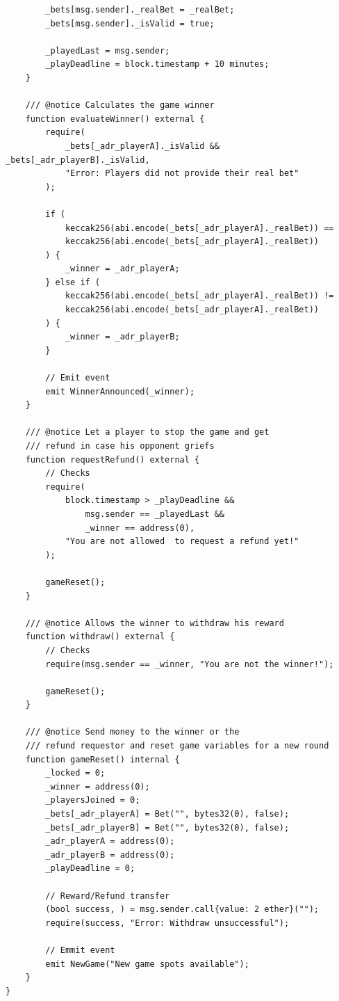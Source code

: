\documentclass[12pt,a4paper]{article}
\begin{document}
\begin{lstlisting}
        _bets[msg.sender]._realBet = _realBet;
        _bets[msg.sender]._isValid = true;

        _playedLast = msg.sender;
        _playDeadline = block.timestamp + 10 minutes;
    }

    /// @notice Calculates the game winner
    function evaluateWinner() external {
        require(
            _bets[_adr_playerA]._isValid && _bets[_adr_playerB]._isValid,
            "Error: Players did not provide their real bet"
        );

        if (
            keccak256(abi.encode(_bets[_adr_playerA]._realBet)) ==
            keccak256(abi.encode(_bets[_adr_playerA]._realBet))
        ) {
            _winner = _adr_playerA;
        } else if (
            keccak256(abi.encode(_bets[_adr_playerA]._realBet)) !=
            keccak256(abi.encode(_bets[_adr_playerA]._realBet))
        ) {
            _winner = _adr_playerB;
        }

        // Emit event
        emit WinnerAnnounced(_winner);
    }

    /// @notice Let a player to stop the game and get 
    /// refund in case his opponent griefs
    function requestRefund() external {
        // Checks
        require(
            block.timestamp > _playDeadline &&
                msg.sender == _playedLast &&
                _winner == address(0),
            "You are not allowed  to request a refund yet!"
        );

        gameReset();
    }

    /// @notice Allows the winner to withdraw his reward
    function withdraw() external {
        // Checks
        require(msg.sender == _winner, "You are not the winner!");

        gameReset();
    }

    /// @notice Send money to the winner or the 
    /// refund requestor and reset game variables for a new round
    function gameReset() internal {
        _locked = 0;
        _winner = address(0);
        _playersJoined = 0;
        _bets[_adr_playerA] = Bet("", bytes32(0), false);
        _bets[_adr_playerB] = Bet("", bytes32(0), false);
        _adr_playerA = address(0);
        _adr_playerB = address(0);
        _playDeadline = 0;

        // Reward/Refund transfer
        (bool success, ) = msg.sender.call{value: 2 ether}("");
        require(success, "Error: Withdraw unsuccessful");

        // Emmit event
        emit NewGame("New game spots available");
    }
}
\end{lstlisting}
\end{document}

